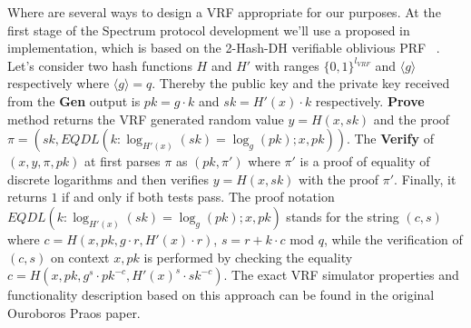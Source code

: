 Where are several ways to design a VRF appropriate for our purposes.
At the first stage of the Spectrum protocol development we'll use a proposed in ~\cite{cryptoeprint:2017/573} implementation, which is based on the 2-Hash-DH verifiable oblivious PRF ~\cite{asiacrypt:2014/233}.
Let's consider two hash functions $H$ and $H'$ with ranges $\{0,1\}^{l_{VRF}}$ and ${\langle g \rangle}$ respectively where ${\langle g \rangle = q}$.
Thereby the public key and the private key received from the \textbf{Gen} output is ${pk = g \cdot k}$ and ${sk = H'(x) \cdot k}$ respectively.
\textbf{Prove} method returns the VRF generated random value ${y = H(x, sk)}$ and the proof ${\pi = (sk, EQDL(k : \log_{H'(x)}(sk) = \log_{g}(pk); x, pk))}$.
The \textbf{Verify} of ${(x, y, \pi, pk)}$ at first parses $\pi$ as ${(pk, \pi')}$ where $\pi'$ is a proof of equality of discrete logarithms and then verifies ${y = H(x, sk)}$ with the proof $\pi'$.
Finally, it returns $1$ if and only if both tests pass.
The proof notation ${EQDL(k : \log_{H'(x)}(sk) = \log_{g}(pk); x, pk)}$ stands for the string ${(c, s)}$ where $c = H(x, pk, g \cdot r, H'(x) \cdot r)$, ${s = r + k \cdot c}$ mod $q$, while the verification of ${(c, s)}$ on context ${x, pk}$ is performed by checking the equality
${c = H(x, pk, g^s \cdot pk^{-c}, H'(x)^s \cdot sk^{-c})}$.
The exact VRF simulator properties and functionality description based on this approach can be found in the original Ouroboros Praos paper.



